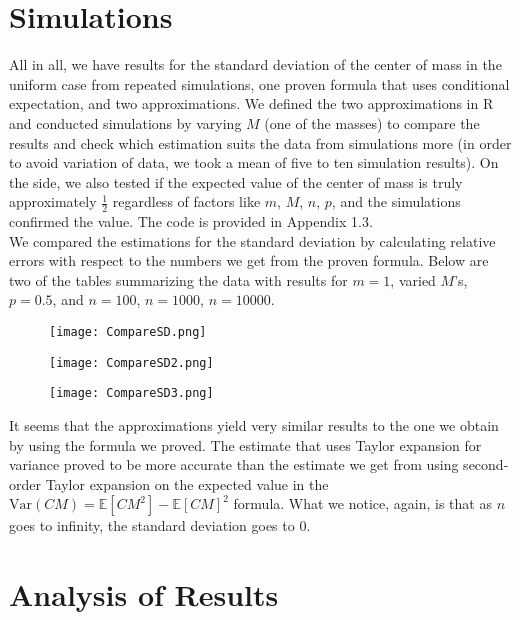\documentclass[11pt, twoside, reqno]{book}
\newcommand{\Var}{\text{Var}}
\newcommand{\E}{\mathbb{E}}
\begin{document}
\section{Simulations}
\label{secB6}
All in all, we have results for the standard deviation of the center of mass in the uniform case from repeated simulations, one proven formula that uses conditional expectation, and two approximations. We defined the two approximations in R and conducted simulations by varying $M$ (one of the masses) to compare the results and check which estimation suits the data from simulations more (in order to avoid variation of data, we took a mean of five to ten simulation results). On the side, we also tested if the expected value of the center of mass is truly approximately $\frac{1}{2}$ regardless of factors like $m$, $M$, $n$, $p$, and the simulations confirmed the value. The code is provided in Appendix 1.3. \\
We compared the estimations for the standard deviation by calculating relative errors with respect to the numbers we get from the proven formula. Below are two of the tables summarizing the data with results for $m=1$, varied $M$'s, $p=0.5$, and $n=100$, $n=1000$, $n=10000$.

\begin{figure}[ht]
\centering
\texttt{[image: CompareSD.png]}
\end{figure}

\begin{figure}[ht]
\centering
\texttt{[image: CompareSD2.png]}
\end{figure}

\begin{figure}[ht]
\centering
\texttt{[image: CompareSD3.png]}
\end{figure}

It seems that the approximations yield very similar results to the one we obtain by using the formula we proved. The estimate that uses Taylor expansion for variance proved to be more accurate than the estimate we get from using second-order Taylor expansion on the expected value in the $\Var(CM)=\E[CM^{2}]-\E[CM]^{2}$ formula. What we notice, again, is that as $n$ goes to infinity, the standard deviation goes to $0$.

\section{Analysis of Results}
\label{secB7}
\end{document}
